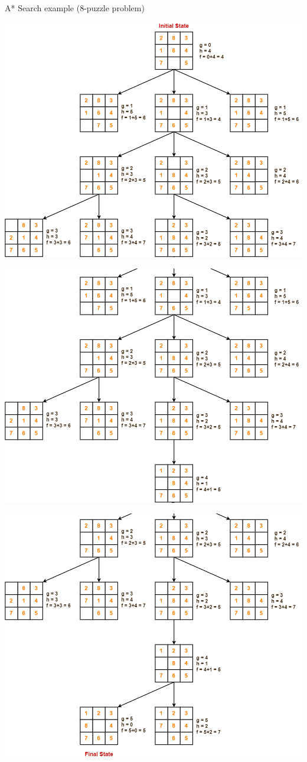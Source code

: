 \documentclass[9pt]{beamer}
\begin{document}
\begin{frame}{A* Search example (8-puzzle problem)}
\begin{small}
 {
\begin{center}
    \includegraphics[keepaspectratio, width=0.75\linewidth]{images/Solve-Problem-01-04.png}
\end{center}
}

 {
\begin{center}
    \includegraphics[keepaspectratio, width=0.75\linewidth]{images/Solve-Problem-01-05.png}
\end{center}
}

 {
\begin{center}
    \includegraphics[keepaspectratio, width=0.75\linewidth]{images/Solve-Problem-01-06.png}
\end{center}
}

\end{small}
\end{frame}
\end{document}
